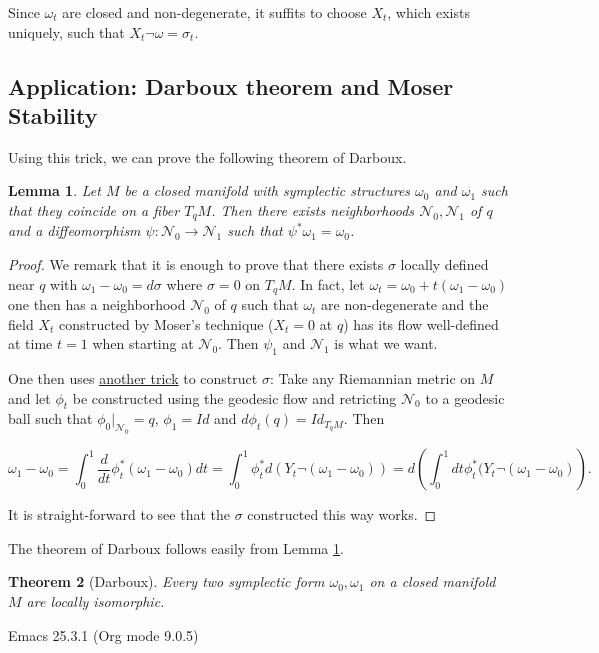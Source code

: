 \documentclass[11pt]{article}
\newtheorem{theorem}{Theorem}
\newtheorem{lemma}[theorem]{Lemma}
\begin{document}
Since \(\omega_t\) are closed and non-degenerate, it suffits to choose \(X_t\), which exists
uniquely, such that \(X_t \neg \omega = \sigma_t\).

\subsection{Application: Darboux theorem and Moser Stability}
\label{sec:orgb93185e}
Using this trick, we can prove the following theorem of Darboux.

\begin{lemma}
\label{lem1}
Let \(M\) be a closed manifold with symplectic structures \(\omega_0\) and \(\omega_1\) such
that they coincide on a fiber \(T_qM\). Then there exists neighborhoods \(\mathcal{N}_0,
\mathcal{N}_1\) of \(q\) and a diffeomorphism \(\psi: \mathcal{N}_0 \longrightarrow
\mathcal{N}_1\) such that \(\psi^* \omega_1 = \omega_0\). 
\end{lemma}


\begin{proof}
We remark that it is enough to prove that there exists \(\sigma\) locally defined near \(q\)
with \(\omega_1 -\omega_0 = d\sigma\) where \(\sigma = 0\) on \(T_qM\). In fact, let \(\omega_t =
\omega_0 + t(\omega_1 - \omega_0)\) one then has a neighborhood \(\mathcal{N}_0\) of \(q\)
such that \(\omega_t\) are non-degenerate and the field \(X_t\) constructed by Moser's
technique (\(X_t=0\) at \(q\)) has its flow well-defined at time \(t=1\) when starting at \(\mathcal{N}_0\). Then \(\psi_1\) and \(\mathcal{N}_1\) is what we want.

One then uses \uline{another trick} to construct \(\sigma\): Take any Riemannian metric on \(M\) and
let \(\phi_t\) be constructed using the geodesic flow and retricting \(\mathcal{N}_0\) to a
geodesic ball such that \(\phi_0|_{\mathcal{N}_0} = q\), \(\phi_1 = Id\) and \(d\phi_t (q) =
Id_{T_qM}\). Then

\[
\omega_1 - \omega_0 = \int_0^1 \frac{d}{dt}\phi^*_t(\omega_1 - \omega_0) dt = \int_0^1
\phi_t^* d(Y_t \neg(\omega_1 - \omega_0) )= d \left( \int_0^1 dt \phi_t^*(Y_t \neg
(\omega_1 - \omega_0) \right).
\]

It is straight-forward to see that the \(\sigma\) constructed this way works.
\end{proof}

The theorem of Darboux follows easily from Lemma \ref{lem1}.

\begin{theorem}[Darboux]
Every two symplectic form \(\omega_0, \omega_1\) on a closed manifold \(M\) are locally isomorphic.
\end{theorem}
Emacs 25.3.1 (Org mode 9.0.5)
\end{document}
